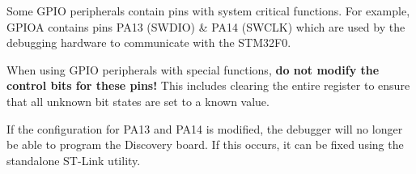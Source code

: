 \documentclass[openany,11pt,fleqn]{book} %
\begin{document}
\begin{warning}
    Some GPIO peripherals contain pins with system critical functions. For example, GPIOA contains pins PA13 (SWDIO) \& PA14 (SWCLK) which are used by the debugging hardware to communicate with the STM32F0. 
    
    When using GPIO peripherals with special functions, \textbf{do not modify the control bits for these pins!} This includes clearing the entire register to ensure that all unknown bit states are set to a known value. 
    
    If the configuration for PA13 and PA14 is modified, the debugger will no longer be able to program the Discovery board. If this occurs, it can be fixed using the standalone ST-Link utility.
\end{warning}
\end{document}
